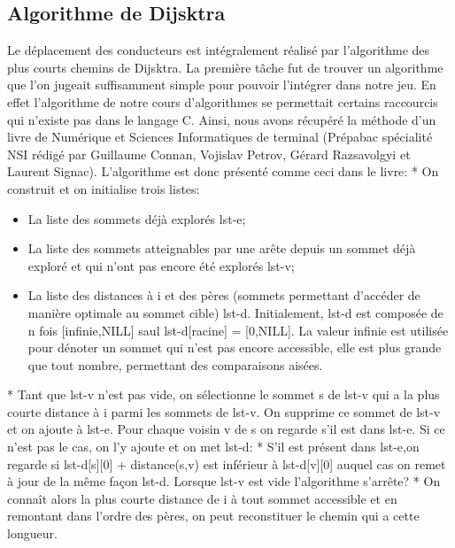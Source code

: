\documentclass[a4paper, 12pt]{article}
\begin{document}
    \subsection{Algorithme de Dijsktra}
        Le déplacement des conducteurs est intégralement réalisé par l'algorithme des plus courts chemins de Dijsktra. La première tâche fut de trouver un algorithme que l'on jugeait suffisamment simple pour pouvoir l'intégrer dans notre jeu. En effet l'algorithme de notre cours d'algorithmes se permettait certains raccourcis qui n'existe pas dans le langage C. Ainsi, nous avons récupéré la méthode d'un livre de Numérique et Sciences Informatiques de terminal (Prépabac spécialité NSI rédigé par Guillaume Connan, Vojislav Petrov, Gérard Razsavolgyi et Laurent Signac). \newline
        L'algorithme est donc présenté comme ceci dans le livre:\newline\newline
        * On construit et on initialise trois listes:\newline
        \begin{itemize}
        \item La liste des sommets déjà explorés lst-e;
        \item La liste des sommets atteignables par une arête depuis un sommet déjà exploré et qui n'ont pas encore été explorés lst-v;
        \item La liste des distances à i et des pères (sommets permettant d'accéder de manière optimale au sommet cible) lst-d. Initialement, lst-d est composée de n fois [infinie,NILL] saul lst-d[racine] = [0,NILL]. La valeur infinie est utilisée pour dénoter un sommet qui n'est pas encore accessible, elle est plus grande que tout nombre, permettant des comparaisons aisées.
       \end{itemize}
        * Tant que lst-v n'est pas vide, on sélectionne le sommet s de lst-v qui a la plus courte distance à i parmi les sommets de lst-v. On supprime ce sommet de lst-v et on ajoute à lst-e.\newline
        Pour chaque voisin v de s on regarde s'il est dans lst-e. Si ce n'est pas le cas, on l'y ajoute et on met lst-d:\newline
        * S'il est présent dans lst-e,on regarde si lst-d[s][0] + distance(s,v) est inférieur à lst-d[v][0] auquel cas on remet à jour de la même façon lst-d. Lorsque lst-v est vide l'algorithme s'arrête?\newline
        * On connaît alors la plus courte distance de i à tout sommet accessible et en remontant dans l'ordre des pères, on peut reconstituer le chemin qui a cette longueur.\newline
\end{document}
